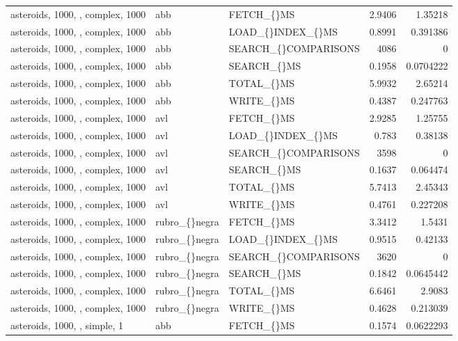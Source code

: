 \begin{longtable}{p{4cm}p{1.4cm}p{2.6cm}rr}
asteroids, 1000, , complex, 1000 & abb & FETCH\_\allowbreak\{\}MS & 2.9406 & 1.35218\\
asteroids, 1000, , complex, 1000 & abb & LOAD\_\allowbreak\{\}INDEX\_\allowbreak\{\}MS & 0.8991 & 0.391386\\
asteroids, 1000, , complex, 1000 & abb & SEARCH\_\allowbreak\{\}COMPARISONS & 4086 & 0\\
asteroids, 1000, , complex, 1000 & abb & SEARCH\_\allowbreak\{\}MS & 0.1958 & 0.0704222\\
asteroids, 1000, , complex, 1000 & abb & TOTAL\_\allowbreak\{\}MS & 5.9932 & 2.65214\\
asteroids, 1000, , complex, 1000 & abb & WRITE\_\allowbreak\{\}MS & 0.4387 & 0.247763\\
asteroids, 1000, , complex, 1000 & avl & FETCH\_\allowbreak\{\}MS & 2.9285 & 1.25755\\
asteroids, 1000, , complex, 1000 & avl & LOAD\_\allowbreak\{\}INDEX\_\allowbreak\{\}MS & 0.783 & 0.38138\\
asteroids, 1000, , complex, 1000 & avl & SEARCH\_\allowbreak\{\}COMPARISONS & 3598 & 0\\
asteroids, 1000, , complex, 1000 & avl & SEARCH\_\allowbreak\{\}MS & 0.1637 & 0.064474\\
asteroids, 1000, , complex, 1000 & avl & TOTAL\_\allowbreak\{\}MS & 5.7413 & 2.45343\\
asteroids, 1000, , complex, 1000 & avl & WRITE\_\allowbreak\{\}MS & 0.4761 & 0.227208\\
asteroids, 1000, , complex, 1000 & rubro\_\allowbreak\{\}negra & FETCH\_\allowbreak\{\}MS & 3.3412 & 1.5431\\
asteroids, 1000, , complex, 1000 & rubro\_\allowbreak\{\}negra & LOAD\_\allowbreak\{\}INDEX\_\allowbreak\{\}MS & 0.9515 & 0.42133\\
asteroids, 1000, , complex, 1000 & rubro\_\allowbreak\{\}negra & SEARCH\_\allowbreak\{\}COMPARISONS & 3620 & 0\\
asteroids, 1000, , complex, 1000 & rubro\_\allowbreak\{\}negra & SEARCH\_\allowbreak\{\}MS & 0.1842 & 0.0645442\\
asteroids, 1000, , complex, 1000 & rubro\_\allowbreak\{\}negra & TOTAL\_\allowbreak\{\}MS & 6.6461 & 2.9083\\
asteroids, 1000, , complex, 1000 & rubro\_\allowbreak\{\}negra & WRITE\_\allowbreak\{\}MS & 0.4628 & 0.213039\\
asteroids, 1000, , simple, 1 & abb & FETCH\_\allowbreak\{\}MS & 0.1574 & 0.0622293\\

\end{longtable}
